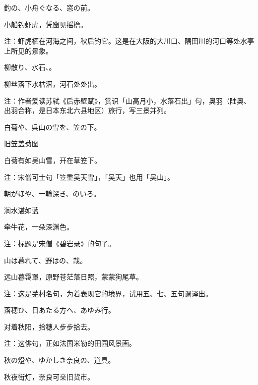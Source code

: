 \begin{haiku}
    {\FH {}釣の、小舟ぐなる、窓の前。}

    {\FK 小船钓虾虎，凭窗见摇橹。}

    {\FT 注：虾虎栖在河海之间，秋后钓它。这是在大阪的大川口、隅田川的河口等处水亭上所见的景象。}
\end{haiku}

\begin{haiku}
    {\FH 柳散り、水石、。}

    {\FK 柳丝落下水枯涸，河石处处出。}

    {\FT 注：作者爱读苏轼《后赤壁赋》，赏识「山高月小，水落石出」句，奥羽（陆奥、出羽合称，是日本东北六县地区）旅行，写三景并列。}
\end{haiku}

\begin{haiku}
    {\FH 白菊や、呉山の雪を、笠の下。}

    {\FK 旧笠盖菊图}

    {\FK 白菊有如吴山雪，开在草笠下。}

    {\FT 注：宋僧可士句「笠重吴天雪」，「吴天」也用「吴山」。}
\end{haiku}

\begin{haiku}
    {\FH 朝がほや、一輪深き、のいろ。}

    {\FK 涧水湛如蓝}

    {\FK 牵牛花，一朵深渊色。}

    {\FT 注：标题是宋僧《碧岩录》的句子。}
\end{haiku}

\begin{haiku}
    {\FH 山は暮れて、野はの、哉。}

    {\FK 远山暮霭罩，原野苍茫落日照，蒙蒙狗尾草。}

    {\FT 注：这是芜村名句，为着表现它的境界，试用五、七、五句调译出。}
\end{haiku}

\begin{haiku}
    {\FH 落穂ひ、日あたる方へ、あゆみ行。}

    {\FK 对着秋阳，拾穗人步步拾去。}

    {\FT 注：这俳句，正如法国米勒的田园风景画。}
\end{haiku}

\begin{haiku}
    {\FH 秋の燈や、ゆかしき奈良の、道具。}

    {\FK 秋夜街灯，奈良可亲旧货市。}
\end{haiku}

